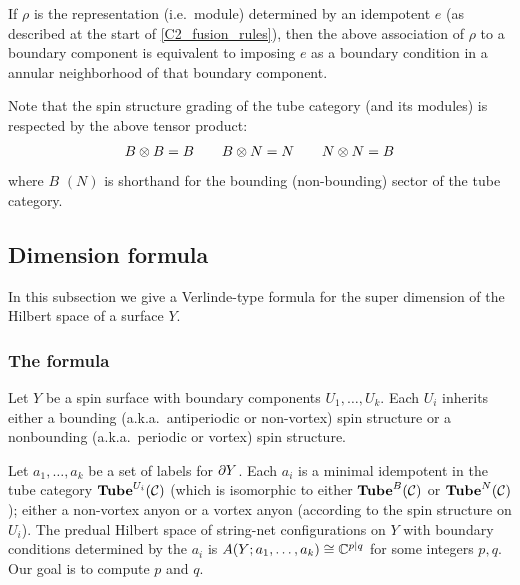 If $\rho$ is the representation (i.e.\ module) determined by an idempotent $e$ (as described at the start of \ref{C2_fusion_rules}),
then the above association of $\rho$ to a boundary component is equivalent to imposing $e$ as a boundary condition
in a annular neighborhood of that boundary component.

Note that the spin structure grading of the tube category (and its modules) is respected by the above tensor product:
\begin{align}
B \otimes B = B \quad \quad B \otimes N = N \quad \quad N \otimes N = B
\end{align}
where $B$ $(N)$ is shorthand for the bounding (non-bounding) sector of the tube category.


\subsection{Dimension formula}

In this subsection we give a Verlinde-type formula for the super dimension of the Hilbert space of a surface $Y$.


\subsubsection{The formula}   \label{dimformula_ss}

Let $Y$ be a spin surface with boundary components $U_1, \ldots, U_k$.
Each $U_i$ inherits either a bounding (a.k.a.\ antiperiodic or non-vortex) spin structure or a nonbounding 
(a.k.a.\ periodic or vortex) spin structure.

Let $a_1,\ldots, a_k$ be a set of labels for $\partial Y$.
Each $a_i$ is a minimal idempotent in the tube category $\textbf{Tube}^{U_i}(\mathcal{C})$
(which is isomorphic to either $\textbf{Tube}^B(\mathcal{C})$ or $\textbf{Tube}^N(\mathcal{C})$); 
either a non-vortex anyon or a vortex anyon
(according to the spin structure on $U_i$).
The predual Hilbert space of string-net configurations on $Y$ with boundary conditions 
determined by the $a_i$ is $A(Y; a_1,\ldots, a_k) \cong \mathbb{C}^{p|q}$ for some integers $p,q$.
Our goal is to compute $p$ and $q$.

\medskip

